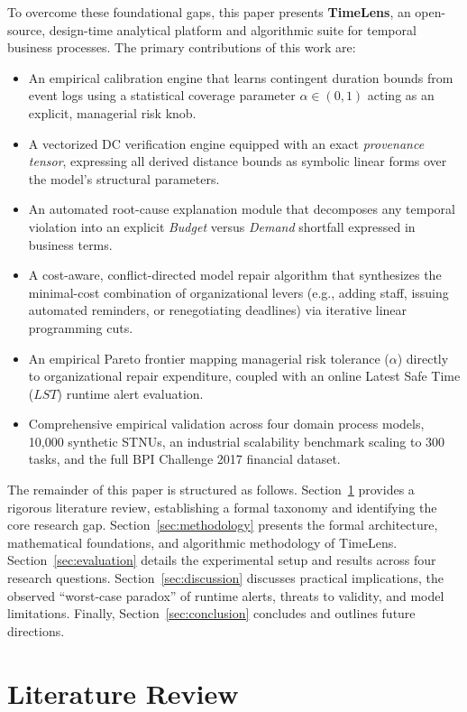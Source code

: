 \documentclass[conference]{IEEEtran}
\begin{document}
To overcome these foundational gaps, this paper presents \textbf{TimeLens}, an open-source, design-time analytical platform and algorithmic suite for temporal business processes. The primary contributions of this work are:
\begin{itemize}
    \item An empirical calibration engine that learns contingent duration bounds from event logs using a statistical coverage parameter $\alpha \in (0, 1)$ acting as an explicit, managerial risk knob.
    \item A vectorized DC verification engine equipped with an exact \textit{provenance tensor}, expressing all derived distance bounds as symbolic linear forms over the model's structural parameters.
    \item An automated root-cause explanation module that decomposes any temporal violation into an explicit \textit{Budget} versus \textit{Demand} shortfall expressed in business terms.
    \item A cost-aware, conflict-directed model repair algorithm that synthesizes the minimal-cost combination of organizational levers (e.g., adding staff, issuing automated reminders, or renegotiating deadlines) via iterative linear programming cuts.
    \item An empirical Pareto frontier mapping managerial risk tolerance ($\alpha$) directly to organizational repair expenditure, coupled with an online Latest Safe Time ($LST$) runtime alert evaluation.
    \item Comprehensive empirical validation across four domain process models, 10,000 synthetic STNUs, an industrial scalability benchmark scaling to 300 tasks, and the full BPI Challenge 2017 financial dataset.
\end{itemize}

The remainder of this paper is structured as follows. Section~\ref{sec:lit_review} provides a rigorous literature review, establishing a formal taxonomy and identifying the core research gap. Section~\ref{sec:methodology} presents the formal architecture, mathematical foundations, and algorithmic methodology of TimeLens. Section~\ref{sec:evaluation} details the experimental setup and results across four research questions. Section~\ref{sec:discussion} discusses practical implications, the observed ``worst-case paradox'' of runtime alerts, threats to validity, and model limitations. Finally, Section~\ref{sec:conclusion} concludes and outlines future directions.

\section{Literature Review}
\label{sec:lit_review}
\end{document}
